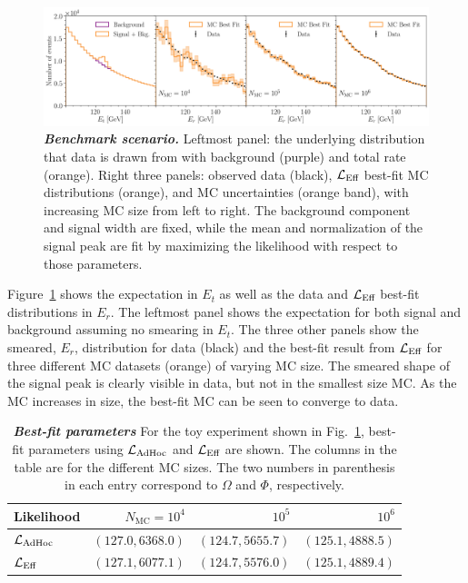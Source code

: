 \documentclass[a4paper, 11pt]{article}
\newcommand{\like}{\mathcal{L}}
\newcommand{\mcl}{\like_\textmd{Eff}}
\newcommand{\adhoc}{\mathcal{L}_{\textmd{AdHoc}}}
\begin{document}
\begin{figure}[htp]
\centering
    \includegraphics[width=1.\linewidth]{fig/fig4}
\caption{\textbf{\textit{Benchmark scenario.}} Leftmost panel: the underlying distribution that data is drawn from with background (purple) and total rate (orange). Right three panels: observed data (black), $\mcl$ best-fit MC distributions (orange), and MC uncertainties (orange band), with increasing MC size from left to right. The background component and signal width are fixed, while the mean and normalization of the signal peak are fit by maximizing the likelihood with respect to those parameters.}
\label{fig:toymc}
\end{figure}

Figure~\ref{fig:toymc} shows the expectation in $E_t$ as well as the data and $\mcl$ best-fit distributions in $E_r$. The leftmost panel shows the expectation for both signal and background assuming no smearing in $E_t$. The three other panels show the smeared, $E_r$, distribution for data (black) and the best-fit result from $\mcl$ for three different MC datasets (orange) of varying MC size. The smeared shape of the signal peak is clearly visible in data, but not in the smallest size MC. As the MC increases in size, the best-fit MC can be seen to converge to data.

\begin{table}[htp]
\centering
\begin{tabular}{l r r r}
\toprule
Likelihood & $N_\mathrm{MC}=10^4$ & $10^5$ & $10^6$ \\
\midrule
$\adhoc$ & $(127.0,6368.0)$ & $(124.7,5655.7)$ & $(125.1,4888.5)$ \\ \hline
$\mcl$ & $(127.1,6077.1)$ & $(124.7,5576.0)$ & $(125.1,4889.4)$ \\
\bottomrule
\end{tabular}
\caption{\textbf{\textit{Best-fit parameters}} For the toy experiment shown in Fig.~\ref{fig:toymc}, best-fit parameters using $\adhoc$ and $\mcl$ are shown. The columns in the table are for the different MC sizes. The two numbers in parenthesis in each entry correspond to $\Omega$ and $\Phi$, respectively.}
\label{tbl:pointestimator}
\end{table}
\end{document}
